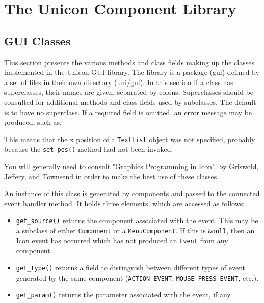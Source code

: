 \chapter{The Unicon Component Library}

\section{GUI Classes}

This section presents the various methods and class fields making up the
classes implemented in the Unicon GUI library. The library is a package
(gui) defined by a set of files in their own directory (uni/gui). In
this section if a class has superclasses, their names are given,
separated by colons. Superclasses should be consulted for additional
methods and class fields used by subclasses. The
default is to have no superclass.
If a required field is omitted, an error message may be produced,
such as:


\noindent This means that the x position of a \texttt{TextList} object was not specified,
probably because the \texttt{set\_pos()} method had not been invoked.

You will generally need to consult
"Graphics Programming in Icon", by
Griswold, \linebreak Jeffery, and Townsend
in order to make the best use of these classes.

\medskip{}

An instance of this class is generated by components and passed to the
connected event handler method. It holds three elements, which
are accessed as follows:

\begin{itemize}
\item \noindent\texttt{get\_source()} returns the component associated with the event. This may
be a subclass of either  \texttt{Component} or a  \texttt{MenuComponent}. If this is
\texttt{\&null}, then an Icon event has occurred which has not produced an  \texttt{Event}
from any component.

\item\noindent\texttt{get\_type()} returns a field to distinguish between different types of
event generated by the same component (\texttt{ACTION\_EVENT},
\texttt{MOUSE\_PRESS\_EVENT}, etc.).

\item\noindent\texttt{get\_param()} returns the parameter associated with the event, if any.
\end{itemize}


